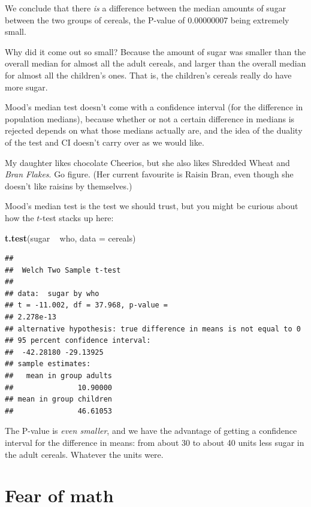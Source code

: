 \documentclass[]{tufte-book}
\newenvironment{Shaded}{}{}
\newcommand{\DataTypeTok}[1]{\textcolor[rgb]{0.56,0.13,0.00}{#1}}
\newcommand{\KeywordTok}[1]{\textcolor[rgb]{0.00,0.44,0.13}{\textbf{#1}}}
\newcommand{\NormalTok}[1]{#1}
\newcommand{\OperatorTok}[1]{\textcolor[rgb]{0.40,0.40,0.40}{#1}}
\newcommand{\StringTok}[1]{\textcolor[rgb]{0.25,0.44,0.63}{#1}}
\theoremstyle{definition}
\theoremstyle{definition}
\theoremstyle{definition}
\theoremstyle{remark}
\begin{document}
We conclude that there \emph{is} a difference between the median amounts
of sugar between the two groups of cereals, the P-value of 0.00000007
being extremely small.

Why did it come out so small? Because the amount of sugar was smaller
than the overall median for almost all the adult cereals, and larger
than the overall median for almost all the children's ones. That is, the
children's cereals really do have more sugar.

Mood's median test doesn't come with a confidence interval (for the
difference in population medians), because whether or not a certain
difference in medians is rejected depends on what those medians actually
are, and the idea of the duality of the test and CI doesn't carry over
as we would like.

My daughter likes chocolate Cheerios, but she also likes Shredded Wheat
and \emph{Bran Flakes}. Go figure. (Her current favourite is Raisin
Bran, even though she doesn't like raisins by themselves.)

Mood's median test is the test we should trust, but you might be curious
about how the \(t\)-test stacks up here:

\begin{Shaded}
\begin{Highlighting}[]
\KeywordTok{t.test}\NormalTok{(sugar }\OperatorTok{~}\StringTok{ }\NormalTok{who, }\DataTypeTok{data =}\NormalTok{ cereals)}
\end{Highlighting}
\end{Shaded}

\begin{verbatim}
## 
##  Welch Two Sample t-test
## 
## data:  sugar by who
## t = -11.002, df = 37.968, p-value =
## 2.278e-13
## alternative hypothesis: true difference in means is not equal to 0
## 95 percent confidence interval:
##  -42.28180 -29.13925
## sample estimates:
##   mean in group adults 
##               10.90000 
## mean in group children 
##               46.61053
\end{verbatim}

The P-value is \emph{even smaller}, and we have the advantage of getting
a confidence interval for the difference in means: from about 30 to
about 40 units less sugar in the adult cereals. Whatever the units were.

\hypertarget{fear-of-math}{%
\section{Fear of math}\label{fear-of-math}}
\end{document}
